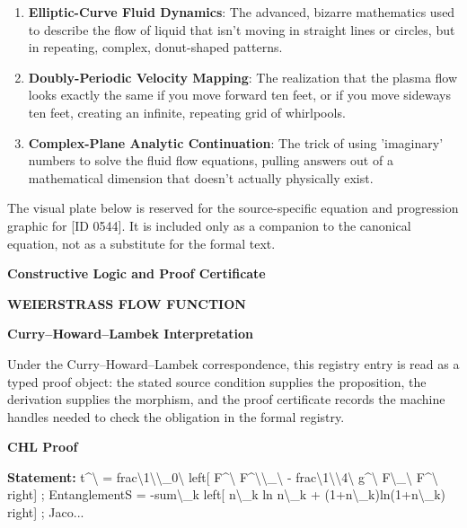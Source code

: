 \begin{enumerate}[leftmargin=1.6em,itemsep=6pt,topsep=4pt]
\item \textbf{Elliptic-Curve Fluid Dynamics}: The advanced, bizarre mathematics used to describe the flow of liquid that isn't moving in straight lines or circles, but in repeating, complex, donut-shaped patterns.
\item \textbf{Doubly-Periodic Velocity Mapping}: The realization that the plasma flow looks exactly the same if you move forward ten feet, or if you move sideways ten feet, creating an infinite, repeating grid of whirlpools.
\item \textbf{Complex-Plane Analytic Continuation}: The trick of using 'imaginary' numbers to solve the fluid flow equations, pulling answers out of a mathematical dimension that doesn't actually physically exist.
\end{enumerate}

\begingroup\footnotesize\sloppy
The visual plate below is reserved for the source-specific equation and progression graphic for [ID 0544]. It is included only as a companion to the canonical equation, not as a substitute for the formal text.
\par\endgroup
\ifTZPDarkEdition
{}
\fi

\clearpage
\begingroup\tzpsupportsetup
\noindent\textbf{\fontsize{10.8pt}{12.8pt}\selectfont [ID 0544] Constructive Logic and Proof Certificate}\par
\noindent\textbf{\fontsize{10pt}{12pt}\selectfont WEIERSTRASS FLOW FUNCTION}\par
\vspace{0.45em}
\begingroup
\footnotesize
\setlength{\parskip}{0.22em}
\setlength{\parindent}{0pt}
\noindent\textbf{Curry--Howard--Lambek Interpretation}\par
Under the Curry--Howard--Lambek correspondence, this registry entry is read as a typed proof
object: the stated source condition supplies the proposition, the derivation supplies the
morphism, and the proof certificate records the machine handles needed to check the obligation
in the formal registry.

\vspace{0.45em}
\noindent\textbf{CHL Proof}\par
\textbf{Statement:} t\textasciicircum{}\textbackslash{} = frac\textbackslash{}1\textbackslash{}\textbackslash{}\_0\textbackslash{} left[ F\textasciicircum{}\textbackslash{} F\textasciicircum{}\textbackslash{}\textbackslash{}\_\textbackslash{} - frac\textbackslash{}1\textbackslash{}\textbackslash{}4\textbackslash{} g\textasciicircum{}\textbackslash{} F\textbackslash{}\_\textbackslash{} F\textasciicircum{}\textbackslash{} right] ; EntanglementS =
-sum\textbackslash{}\_k left[ n\textbackslash{}\_k ln n\textbackslash{}\_k + (1+n\textbackslash{}\_k)ln(1+n\textbackslash{}\_k) right] ; Jaco...

